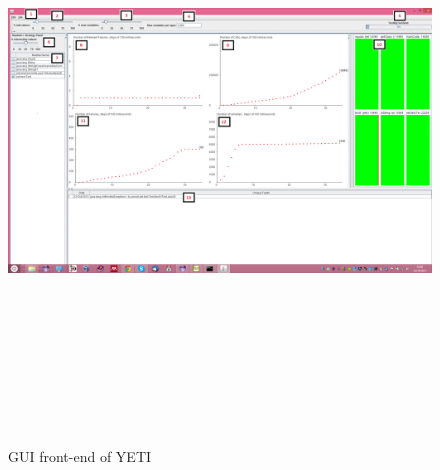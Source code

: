 \begin{figure}
\centering
\centerline{\includegraphics[width=24cm,height=16cm]{chapter3/yetiGUI.png}}
\caption{GUI front-end of YETI}
\label{fig:yetiGUI_3}
\end{figure}




